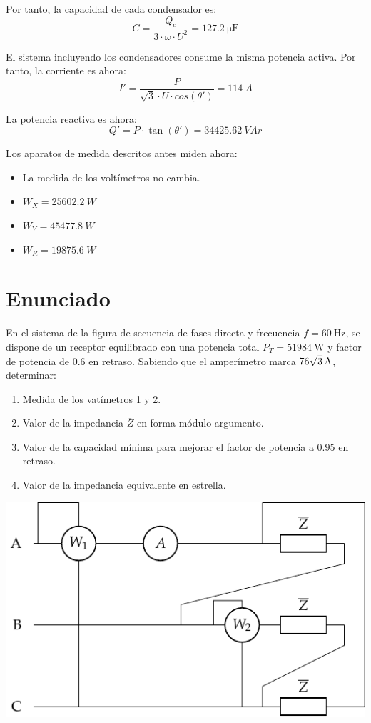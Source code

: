 \vspace{2mm}
Por tanto, la capacidad de cada condensador es:
\[
  C = \frac{Q_c}{3 \cdot \omega \cdot U^2} = \SI{127.2}{\micro\farad}
\]

El sistema incluyendo los condensadores consume la misma potencia
activa. Por tanto, la corriente es ahora:
\[I' = \frac{P}{\sqrt{3} \cdot U \cdot cos(\theta')} = \SI{114}{A}\]

La potencia reactiva es ahora:
\[
  Q' = P \cdot \tan(\theta') = \SI{34425.62}{VAr}
\]

Los aparatos de medida descritos antes miden ahora:
\begin{itemize}
\item La medida de los voltímetros no cambia.
\item $W_X = \SI{25602.2}{W}$
\item $W_Y = \SI{45477.8}{W}$
\item $W_R = \SI{19875.6}{W}$
\end{itemize}


\section{Enunciado}

En el sistema de la figura de secuencia de fases directa y frecuencia
$f=\qty{60}{\hertz}$, se dispone de un receptor equilibrado con una
potencia total $P_T=\qty{51984}{\watt}$ y factor de potencia de $0.6$ en
retraso. Sabiendo que el amperímetro marca
$\qty[parse-numbers=false]{76\sqrt{3}}{\ampere}$, determinar:
\begin{enumerate}
    \item Medida de los vatímetros 1 y 2.
    \item Valor de la impedancia $\overline{Z}$ en forma módulo-argumento.
    \item Valor de la capacidad mínima para mejorar el factor de potencia
    a $0.95$ en retraso.
    \item Valor de la impedancia equivalente en estrella.
\end{enumerate}

\begin{center}
    \includegraphics[width=.5\linewidth]{figuras/dosvat_triangulo.pdf}
\end{center}


